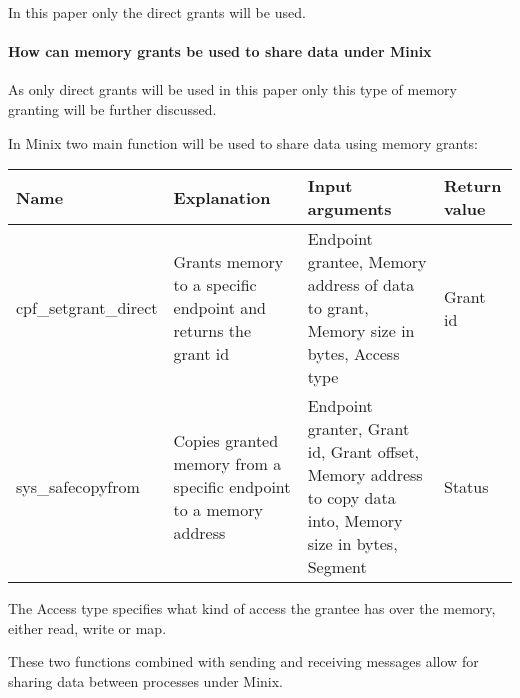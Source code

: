 In this paper only the direct grants will be used.

\hypertarget{how-can-memory-grants-be-used-to-share-data-under-minix}{%
\paragraph{How can memory grants be used to share data under
Minix}\label{how-can-memory-grants-be-used-to-share-data-under-minix}}

As only direct grants will be used in this paper only this type of
memory granting will be further discussed.

In Minix two main function will be used to share data using memory
grants:

\begin{longtable}[]{@{}llll@{}}
\toprule
\begin{minipage}[b]{0.11\columnwidth}\raggedright
Name\strut
\end{minipage} & \begin{minipage}[b]{0.23\columnwidth}\raggedright
Explanation\strut
\end{minipage} & \begin{minipage}[b]{0.30\columnwidth}\raggedright
Input arguments\strut
\end{minipage} & \begin{minipage}[b]{0.25\columnwidth}\raggedright
Return value\strut
\end{minipage}\tabularnewline
\midrule
\endhead
\begin{minipage}[t]{0.11\columnwidth}\raggedright
cpf\_setgrant\_direct\strut
\end{minipage} & \begin{minipage}[t]{0.23\columnwidth}\raggedright
Grants memory to a specific endpoint and returns the grant id\strut
\end{minipage} & \begin{minipage}[t]{0.30\columnwidth}\raggedright
Endpoint grantee, Memory address of data to grant, Memory size in bytes,
Access type\strut
\end{minipage} & \begin{minipage}[t]{0.25\columnwidth}\raggedright
Grant id\strut
\end{minipage}\tabularnewline
\begin{minipage}[t]{0.11\columnwidth}\raggedright
sys\_safecopyfrom\strut
\end{minipage} & \begin{minipage}[t]{0.23\columnwidth}\raggedright
Copies granted memory from a specific endpoint to a memory address\strut
\end{minipage} & \begin{minipage}[t]{0.30\columnwidth}\raggedright
Endpoint granter, Grant id, Grant offset, Memory address to copy data
into, Memory size in bytes, Segment\strut
\end{minipage} & \begin{minipage}[t]{0.25\columnwidth}\raggedright
Status\strut
\end{minipage}\tabularnewline
\bottomrule
\end{longtable}

The Access type specifies what kind of access the grantee has over the
memory, either read, write or map.

These two functions combined with sending and receiving messages allow
for sharing data between processes under Minix.

